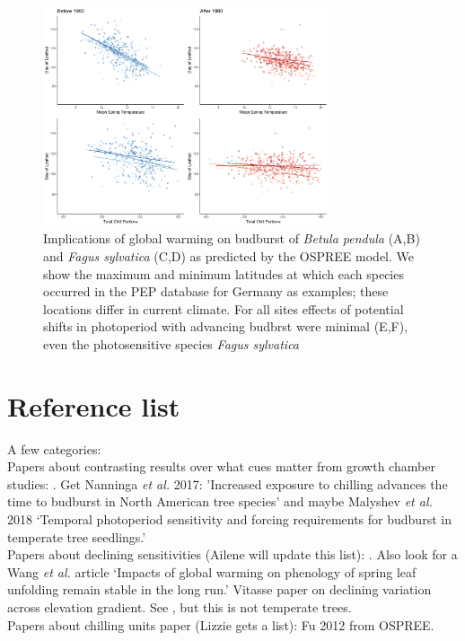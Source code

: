 \documentclass{article}
\begin{document}
\newpage
\begin{figure}[h!]
\centering
\noindent \includegraphics[width=0.75\textwidth]{..//..//analyses/bb_analysis/PEP_climate/figures/BETPEN_multruns_portions.pdf}
\caption{Implications of global warming on budburst of \emph{Betula pendula} (A,B) and \emph{Fagus sylvatica} (C,D) as predicted by the OSPREE model. We show the maximum and minimum latitudes at which each species occurred in the PEP database for Germany as examples; these locations differ in current climate. For all sites effects of potential shifts in photoperiod with advancing budbrst were minimal (E,F), even the photosensitive species \emph{Fagus sylvatica}}
\label{fig:pep}
\end{figure}


\section*{Reference list}

A few categories:\\

Papers about contrasting results over what cues matter from growth chamber studies: \cite{Basler:2012,Basler:2014aa,Caffarra:2011qf,Caffarra:2011a,Caffarra:2011b,Heide:2005aa,koerner2010b,Laube:2014a,vitasse2013,zohner2016}. Get Nanninga \emph{et al.} 2017: 'Increased exposure to chilling advances the time to budburst in North American tree species' and maybe Malyshev \emph{et al.} 2018 `Temporal photoperiod sensitivity and forcing requirements for budburst in temperate tree seedlings.'\\

Papers about declining sensitivities (Ailene will update this list): \cite{Rutishauser:2008,fu2015}. Also look for a Wang \emph{et al.} article `Impacts of global warming on phenology of spring leaf unfolding remain stable in the long run.' Vitasse paper on declining variation across elevation gradient. See \cite{yu2010}, but this is not temperate trees. \\

Papers about chilling units paper (Lizzie gets a list): Fu 2012 from OSPREE. \cite{harrington2015}\cite{lued2011,Luedeling:2011qe,Luedeling2013AgFM}\\



\end{document}
